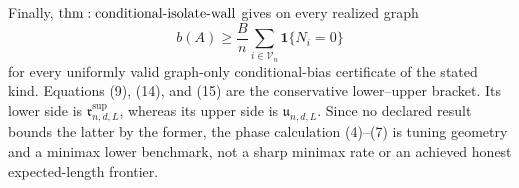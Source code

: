 Finally, \({\rm thm:conditional\text{-}isolate\text{-}wall}\) gives on every realized graph
\[
 b(A)\geq\frac Bn\sum_{i\in\mathcal V_n}\mathbf1\{N_i=0\}
\tag{16}
\]
for every uniformly valid graph-only conditional-bias certificate of the stated kind.  Equations (9), (14), and (15) are the conservative lower--upper bracket.  Its lower side is \(\mathfrak r^{\mathrm{sup}}_{n,d,L}\), whereas its upper side is \(\mathfrak u_{n,d,L}\).  Since no declared result bounds the latter by the former, the phase calculation (4)--(7) is tuning geometry and a minimax lower benchmark, not a sharp minimax rate or an achieved honest expected-length frontier.